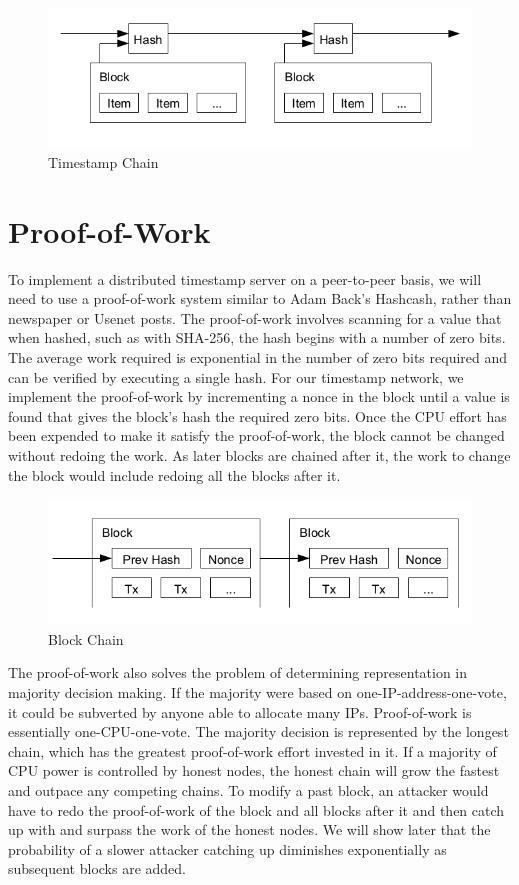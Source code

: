 \begin{figure}[ht!]
\centering
\includegraphics[trim = 0mm 0mm 0mm 0mm, width=120mm]{timestamp}
\caption{Timestamp Chain}
\end{figure}

\section{Proof-of-Work}

To implement a distributed timestamp server on a peer-to-peer basis, we will need to use a proof-of-work system similar to Adam Back's Hashcash, rather than newspaper or Usenet posts. The proof-of-work involves scanning for a value that when hashed, such as with SHA-256, the hash begins with a number of zero bits. The average work required is exponential in the number of zero bits required and can be verified by executing a single hash.
For our timestamp network, we implement the proof-of-work by incrementing a nonce in the block until a value is found that gives the block's hash the required zero bits. Once the CPU effort has been expended to make it satisfy the proof-of-work, the block cannot be changed without redoing the work. As later blocks are chained after it, the work to change the block would include redoing all the blocks after it.

\begin{figure}[ht!]
\centering
\includegraphics[trim = 0mm 0mm 0mm 0mm, width=120mm]{block_chain}
\caption{Block Chain}
\end{figure}

The proof-of-work also solves the problem of determining representation in majority decision making. If the majority were based on one-IP-address-one-vote, it could be subverted by anyone able to allocate many IPs. Proof-of-work is essentially one-CPU-one-vote. The majority decision is represented by the longest chain, which has the greatest proof-of-work effort invested in it. If a majority of CPU power is controlled by honest nodes, the honest chain will grow the fastest and outpace any competing chains. To modify a past block, an attacker would have to redo the proof-of-work of the block and all blocks after it and then catch up with and surpass the work of the honest nodes. We will show later that the probability of a slower attacker catching up diminishes exponentially as subsequent blocks are added.

